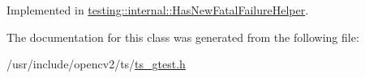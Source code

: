 Implemented in \hyperlink{classtesting_1_1internal_1_1HasNewFatalFailureHelper_ac7b5e77c9847b2b057cb97193ba82441}{testing\-::internal\-::\-Has\-New\-Fatal\-Failure\-Helper}.



The documentation for this class was generated from the following file\-:\begin{DoxyCompactItemize}
\item 
/usr/include/opencv2/ts/\hyperlink{ts__gtest_8h}{ts\-\_\-gtest.\-h}\end{DoxyCompactItemize}
